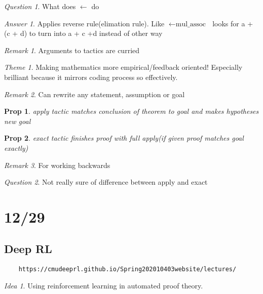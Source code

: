 \documentclass[11pt]{article}
\newtheorem{prop}{Prop}
\theoremstyle{remark}
\newtheorem{remark}{Remark}
\newtheorem{quest}{Question}
\newtheorem{ans}{Answer}
\newtheorem{theme}{Theme}
\newtheorem{idea}{Idea}
\begin{document}
\begin{quest}
	What does $\leftarrow$ do
\end{quest}
\begin{ans}
	Applies reverse rule(elimation rule). Like $\leftarrow \text{mul\_assoc } $  looks for a + (c + d) to turn into a + c +d instead of other way 
\end{ans}

\begin{remark}
	Arguments to tactics are curried
\end{remark}

\begin{theme}
	Making mathematics more empirical/feedback oriented! Especially brilliant because it mirrors coding process so effectively.
\end{theme}

\begin{remark}
	Can rewrite any statement, assumption or goal
\end{remark}

\begin{prop}
	apply tactic matches conclusion of theorem to goal and makes hypotheses new goal
\end{prop}

\begin{prop}
	exact tactic finishes proof with full apply(if given proof matches goal exactly)
\end{prop}

\begin{remark}
	For working backwards
\end{remark}

\begin{quest}
	Not really sure of difference between apply and exact
\end{quest}

\section{12/29}

\subsection{Deep RL}

\begin{verbatim}
	https://cmudeeprl.github.io/Spring202010403website/lectures/
\end{verbatim}

\begin{idea}
	Using reinforcement learning in automated proof theory.
\end{idea}
\end{document}
